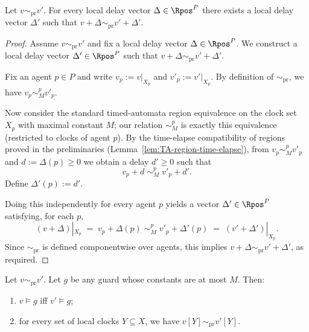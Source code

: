 \begin{lemma}
\label{lemma:region-local-delay}
Let $v \sim_{\mathrm{pr}} v'$. For every local delay vector $\Delta\in \Rpos^{P}$
there exists a local delay vector $\Delta'$ such that
$v+\Delta \sim_{\mathrm{pr}} v'+\Delta'$.
\end{lemma}


\begin{proof}
Assume $v \sim_{\mathrm{pr}} v'$ and fix a local delay vector
$\Delta\in\Rpos^{P}$.
We construct a local delay vector $\Delta'\in\Rpos^{P}$ such that
$v+\Delta \sim_{\mathrm{pr}} v'+\Delta'$.

Fix an agent $p\in P$ and write $v_p := v|_{X_p}$ and $v'_p := v'|_{X_p}$.
By definition of $\sim_{\mathrm{pr}}$, we have $v_p \sim^p_M v'_p$.

Now consider the standard timed-automata region equivalence on the clock set
$X_p$ with maximal constant $M$; our relation $\sim^p_M$ is exactly this
equivalence (restricted to clocks of agent $p$).
By the time-elapse compatibility of regions proved in the preliminaries
(Lemma~\ref{lem:TA-region-time-elapse}), from $v_p \sim^p_M v'_p$ and
$d:=\Delta(p)\ge 0$ we obtain a delay $d'\ge 0$ such that
\[
  v_p + d \;\sim^p_M\; v'_p + d'.
\]
Define $\Delta'(p):=d'$.

Doing this independently for every agent $p$ yields a vector
$\Delta'\in \Rpos^{P}$ satisfying, for each $p$,
\[
  (v+\Delta)|_{X_p} \;=\; v_p+\Delta(p) \;\sim^p_M\; v'_p+\Delta'(p)
  \;=\; (v'+\Delta')|_{X_p}.
\]
Since $\sim_{\mathrm{pr}}$ is defined componentwise over agents, this implies
$v+\Delta \sim_{\mathrm{pr}} v'+\Delta'$, as required.
\end{proof}

\begin{lemma}
\label{lem:region-guard-reset}
Let $v \sim_{\mathrm{pr}} v'$. Let $g$ be any guard whose constants are at most
$M$. Then:
\begin{enumerate}
  \item $v\models g$ iff $v'\models g$;
  \item for every set of local clocks $Y\subseteq X$, we have $v[Y]\sim_{\mathrm{pr}} v'[Y]$.
\end{enumerate}
\end{lemma}

